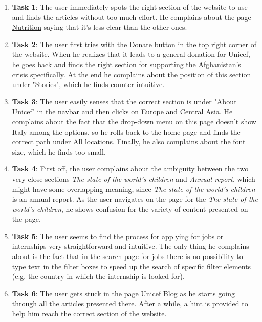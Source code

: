 \begin{enumerate}
	\item \textbf{Task 1}: The user immediately spots the right section of the website to use and finds the articles without too much effort. He complains about the page \href{https://www.unicef.org/nutrition}{Nutrition} saying that it's less clear than the other ones.
	\item \textbf{Task 2}: The user first tries with the Donate button in the top right corner of the website. When he realizes that it leads to a general donation for Unicef, he goes back and finds the right section for supporting the Afghanistan's crisis specifically. At the end he complains about the position of this section under "Stories", which he finds counter intuitive.
	\item \textbf{Task 3}: The user easily senses that the correct section is under "About Unicef" in the navbar and then clicks on \href{https://www.unicef.org/where-we-work#europe-and-central-asia}{Europe and Central Asia}. He complains about the fact that the drop-down menu on this page doesn't show Italy among the options, so he rolls back to the home page and finds the correct path under \href{https://www.unicef.org/where-we-work}{All locations}. Finally, he also complains about the font size, which he finds too small.
	\item \textbf{Task 4}: First off, the user complains about the ambiguity between the two very close sections \textit{The state of the world's children} and \textit{Annual report}, which might have some overlapping meaning, since \textit{The state of the world's children} is an annual report. As the user navigates on the page for the \textit{The state of the world's children}, he shows confusion for the variety of content presented on the page.
	\item \textbf{Task 5}: The user seems to find the process for applying for jobs or internships very straightforward and intuitive. The only thing he complains about is the fact that in the search page for jobs there is no possibility to type text in the filter boxes to speed up the search of specific filter elements (e.g. the country in which the internship is looked for).
	\item \textbf{Task 6}: The user gets stuck in the page \href{https://www.unicef.org/blog}{Unicef Blog} as he starts going through all the articles presented there. After a while, a hint is provided to help him reach the correct section of the website.
	
\end{enumerate}






